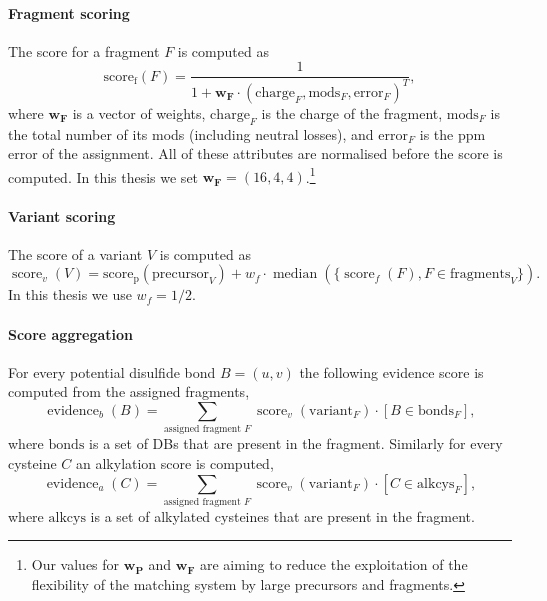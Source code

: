 \paragraph{Fragment scoring} The score for a fragment \(F\) is computed as \[\operatorname{score_f}(F) = \frac{1}{1 + \bm{w_F} \cdot (\mathrm{charge}_{F}, \mathrm{mods}_F, \mathrm{error}_F)^T},\] where \(\bm{w_F}\) is a vector of weights, \(\mathrm{charge}_F\) is the charge of the fragment, \(\mathrm{mods}_F\) is the total number of its mods (including neutral losses), and \(\mathrm{error}_F\) is the ppm error of the assignment. All of these attributes are normalised before the score is computed. In this thesis we set \(\bm{w_F} = (16, 4, 4)\).\footnote{Our values for \(\bm{w_P}\) and \(\bm{w_F}\) are aiming to reduce the exploitation of the flexibility of the matching system by large precursors and fragments.}

\paragraph{Variant scoring} The score of a variant \(V\) is computed as \[\operatorname{score}_v(V) = \operatorname{score_p}(\mathrm{precursor}_V) + w_f \cdot \operatorname{median}(\{ \operatorname{score}_f(F), F \in \mathrm{fragments}_V \}).\] In this thesis we use \(w_f = 1/2\).

\paragraph{Score aggregation} For every potential disulfide bond \(B = (u, v)\) the following evidence score is computed  from the assigned fragments, \[\operatorname{evidence}_b(B) = \sum_{\text{assigned fragment } F} \operatorname{score}_v(\mathrm{variant}_F) \cdot [B \in \mathrm{bonds}_F], \] where \(\mathrm{bonds}\) is a set of DBs that are present in the fragment. Similarly for every cysteine \(C\) an alkylation score is computed, \[\operatorname{evidence}_a(C) = \sum_{\text{assigned fragment } F} \operatorname{score}_v(\mathrm{variant}_F) \cdot [C \in \mathrm{alkcys}_F],\] where \(\mathrm{alkcys}\) is a set of alkylated cysteines that are present in the fragment.

